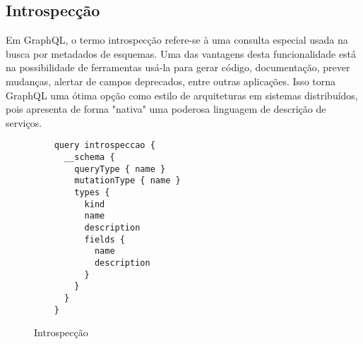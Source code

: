\subsection[Introspecção]{Introspecção}

Em GraphQL, o termo introspecção refere-se à uma consulta especial usada na busca por metadados de esquemas. Uma das vantagens desta funcionalidade está na possibilidade de ferramentas usá-la para gerar código, documentação, prever mudanças, alertar de campos deprecados, entre outras aplicações. Isso torna GraphQL uma ótima opção como estilo de arquiteturas em sistemas distribuídos, pois apresenta de forma "nativa" uma poderosa linguagem de descrição de serviços.

\begin{figure}[H]
  \centering
  \begin{verbatim}
    query introspeccao {
      __schema {
        queryType { name }
        mutationType { name }
        types {
          kind
          name
          description
          fields {
            name
            description
          }
        }
      }
    }
  \end{verbatim}
  \caption{Introspecção}
\end{figure}
